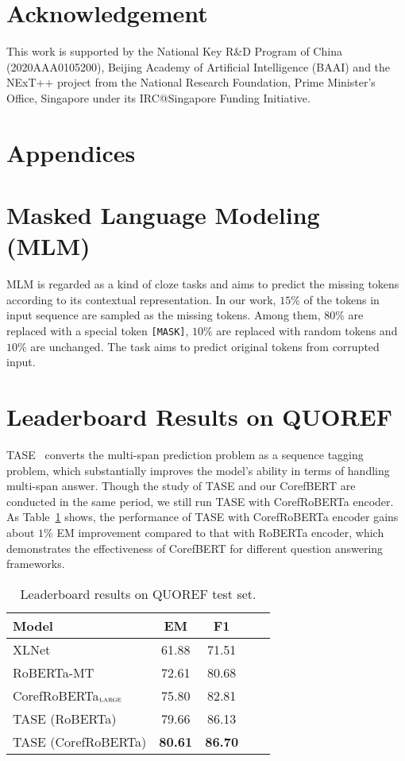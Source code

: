 \documentclass[11pt,a4paper]{article}
\newcommand\CorefBERT{CorefBERT\xspace}
\newcommand\LARGESIZE{$_{\small \textsc{large}}$\xspace}
\begin{document}
\section{Acknowledgement}
This work is supported by the National Key R\&D Program of China (2020AAA0105200), Beijing Academy of Artificial Intelligence (BAAI) and the NExT++ project from the National Research Foundation, Prime Minister’s Office, Singapore under its IRC@Singapore Funding Initiative.





\appendix

\section*{Appendices}
\section{Masked Language Modeling (MLM)} 
MLM is regarded as a kind of cloze tasks and aims to predict the missing tokens according to its contextual representation. In our work, $15$\% of the tokens in  input sequence are sampled as the missing tokens. Among them, $80$\% are replaced with a special token \texttt{[MASK]}, $10$\% are replaced with random tokens and $10$\% are unchanged. The task aims to predict original tokens from corrupted input.


\section{Leaderboard Results on QUOREF } 

TASE~\citep{TASE} converts the multi-span prediction problem as a sequence tagging problem, which substantially improves the model's ability in terms of handling multi-span answer. Though the study of TASE and our \CorefBERT are conducted in the same period, we still run TASE with CorefRoBERTa encoder. As Table~\ref{quorefleaderboard} shows, the performance of TASE with CorefRoBERTa encoder gains about $1\%$ EM improvement compared to that with RoBERTa encoder, which demonstrates the effectiveness of \CorefBERT for different question answering frameworks.

\begin{table}[h]
\small
\centering
\begin{tabular}{l c c c c}
\toprule
Model                              & EM        & F1 \\
\midrule
XLNet~\citep{QUOREF} &  61.88 & 71.51 \\ 
RoBERTa-MT  & 72.61 & 80.68 \\
CorefRoBERTa\LARGESIZE  &  {75.80} & {82.81} \\
TASE (RoBERTa)~\citep{TASE} &  79.66 & 86.13 \\
TASE (CorefRoBERTa) & \bf{80.61} & \bf{86.70} \\
\bottomrule
\end{tabular}
\caption{Leaderboard results on QUOREF test set.}
\label{quorefleaderboard}
\end{table}
\end{document}
